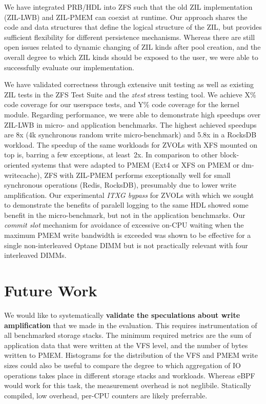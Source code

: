 \documentclass[12pt,a4paper,twoside]{book}
\begin{document}
We have integrated PRB/HDL into ZFS such that the old ZIL implementation (ZIL-LWB) and ZIL-PMEM can coexist at runtime.
Our approach shares the code and data structures that define the logical structure of the ZIL, but provides sufficient flexibility for different persistence mechanisms.
Whereas there are still open issues related to dynamic changing of ZIL kinds after pool creation, and the overall degree to which ZIL kinds should be exposed to the user, we were able to successfully evaluate our implementation.

We have validated correctness through extensive unit testing as well as existing ZIL tests in the ZFS Test Suite and the \textit{ztest} stress testing tool.
We achieve X\% code coverage for our userspace tests, and Y\% code coverage for the kernel module.
Regarding performance, we were able to demonstrate high speedups over ZIL-LWB in micro- and application benchmarks.
The highest achieved speedups are 8x (4k synchronous random write micro-benchmark) and 5.8x in a RocksDB workload.
The speedup of the same workloads for ZVOLs with XFS mounted on top is, barring a few exceptions, at least~2x.
In comparison to other block-oriented systems that were adapted to PMEM (Ext4 or XFS on PMEM or dm-writecache), ZFS with ZIL-PMEM performs exceptionally well for small synchronous operations (Redis, RocksDB), presumably due to lower write amplification.
Our experimental \textit{ITXG bypass} for ZVOLs with which we sought to demonstrate the benefits of paralell logging to the same HDL showed some benefit in the micro-benchmark, but not in the application benchmarks.
Our \textit{commit slot} mechanism for avoidance of excessive on-CPU waiting when the maximum PMEM write bandwidth is exceeded was shown to be effective for a single non-interleaved Optane DIMM but is not practically relevant with four interleaved DIMMs.

\section{Future Work}\label{sec:futurework}

We would like to systematically \textbf{validate the speculations about write amplification} that we made in the evaluation.
This requires instrumentation of all benchmarked storage stacks.
The minimum required metrics are the sum of application data that were written at the VFS level, and the number of bytes written to PMEM.
Histograms for the distribution of the VFS and PMEM write sizes could also be useful to compare the degree to which aggregation of IO operations takes place in different storage stacks and workloads.
Whereas eBPF would work for this task, the measurement overhead is not neglibile.
Statically compiled, low overhead, per-CPU counters are likely preferrable.
\end{document}
